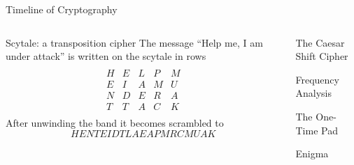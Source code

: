 \documentclass[final,hyperref={pdfpagelabels=false}]{beamer}
\begin{document}
\begin{frame}{}
\begin{block}{\large Timeline of Cryptography}
    \end{block}
    \vfill
    \begin{columns}[t]
      \begin{column}{.48\linewidth}
        \begin{block}{Scytale: a transposition cipher}
        The message ``Help me, I am under attack'' is written on the scytale in rows
        \begin{equation*}
        \begin{array}{|c|c|c|c|c|}
              &    &    &    &   \\
           H  & E  & L  & P  & M \\
           E  & I  & A  & M  & U \\
           N  & D  & E  & R  & A \\
           T  & T  & A  & C  & K \\   
              &    &    &    &   
        \end{array}
        \end{equation*}
        After unwinding the band it becomes scrambled to
        \begin{equation*}
          HENTEIDTLAEAPMRCMUAK
        \end{equation*}
        \end{block}
      \end{column}
      \begin{column}{.48\linewidth}
        \begin{block}{The Caesar Shift Cipher}
        \end{block}

        \begin{block}{Frequency Analysis}
        \end{block}

        \begin{block}{The One-Time Pad}
        \end{block}
        \begin{block}{Enigma}
        \end{block}
      \end{column}
    \end{columns}
  \end{frame}
\end{document}
